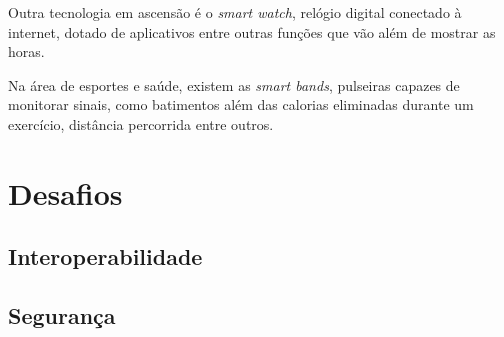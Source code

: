Outra tecnologia em ascensão é o \textit{smart watch}, relógio digital conectado à internet, dotado de aplicativos entre outras funções que vão além de mostrar as horas.

Na área de esportes e saúde, existem as \textit{smart bands}, pulseiras capazes de monitorar sinais, como batimentos além das calorias eliminadas durante um exercício, distância percorrida entre outros.







\section{Desafios}


\subsection{Interoperabilidade}


\subsection{Segurança}